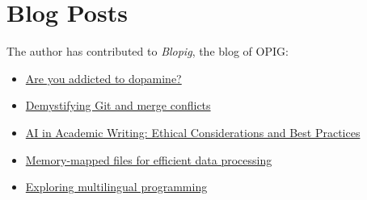 \section*{Blog Posts}

The author has contributed to \textit{Blopig}, the blog of OPIG:

\begin{itemize}
    \item \href{https://www.blopig.com/blog/2025/10/are-you-addicted-to-dopamine/}{Are you addicted to dopamine?}
    \item \href{https://www.blopig.com/blog/2025/05/demystifying-git-and-merge-conflicts/}{Demystifying Git and merge conflicts}
    \item \href{https://www.blopig.com/blog/2025/03/ai-in-academic-writing-ethical-considerations-and-best-practices/}{AI in Academic Writing: Ethical Considerations and Best Practices}
    \item \href{https://www.blopig.com/blog/2024/08/memory-mapped-files-for-efficient-data-processing/}{Memory-mapped files for efficient data processing}
    \item \href{https://www.blopig.com/blog/2024/04/exploring-multilingual-programming/}{Exploring multilingual programming}
\end{itemize}


